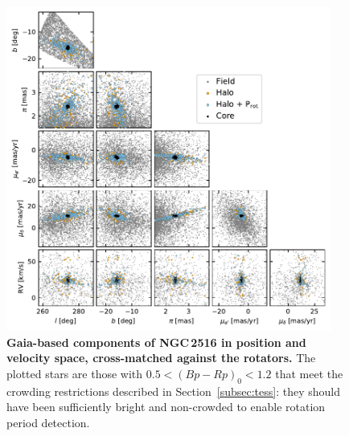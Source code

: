 \documentclass[12pt,twocolumn,tighten]{aastex63}
\begin{document}
\begin{figure}[t]
	\begin{center}
		\leavevmode
		\includegraphics[width=0.95\textwidth]{f4.pdf}
	\end{center}
	\vspace{-0.7cm}
	\caption{ {\bf Gaia-based components of NGC\,2516 in position and
    velocity space, cross-matched against the rotators.}
    The plotted stars are those with $0.5<(Bp-Rp)_0<1.2$ that meet the
    crowding restrictions described in Section~\ref{subsec:tess}: they
    should have been sufficiently bright and non-crowded to enable
    rotation period detection.
		\label{fig:gaia6d_x_rotn}
	}
\end{figure}
\end{document}
